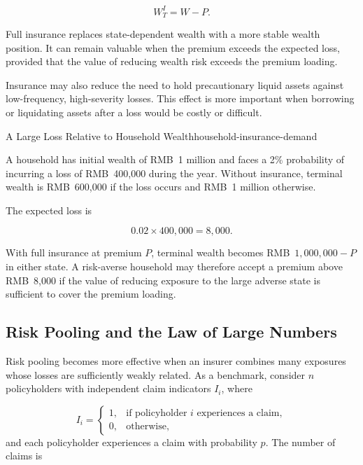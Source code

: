 \begin{equation}
W_T^{I}=W-P.
\label{eq:ch15-fully-insured-wealth}
\end{equation}

Full insurance replaces state-dependent wealth with a more stable wealth position. It can remain valuable when the premium exceeds the expected loss, provided that the value of reducing wealth risk exceeds the premium loading.

Insurance may also reduce the need to hold precautionary liquid assets against low-frequency, high-severity losses. This effect is more important when borrowing or liquidating assets after a loss would be costly or difficult.

\begin{example}{A Large Loss Relative to Household Wealth}{household-insurance-demand}

A household has initial wealth of RMB~1 million and faces
a 2\% probability of incurring a loss of RMB~400,000 during
the year. Without insurance, terminal wealth is RMB~600,000
if the loss occurs and RMB~1 million otherwise.

The expected loss is

$$
0.02\times 400{,}000=8{,}000.
$$

With full insurance at premium $P$, terminal wealth becomes RMB~$1{,}000{,}000-P$ in either state. A risk-averse household may therefore accept a premium above RMB~8,000 if the value of reducing exposure to the large adverse state is sufficient to cover the premium loading.

\end{example}


\subsection{Risk Pooling and the Law of Large Numbers}

Risk pooling becomes more effective when an insurer combines many exposures whose losses are sufficiently weakly related. As a benchmark, consider $n$ policyholders with independent claim indicators $I_i$, where

$$
I_i=
\begin{cases}
1, & \text{if policyholder } i \text{ experiences a claim},\\
0, & \text{otherwise},
\end{cases}
$$
and each policyholder experiences a claim with probability $p$. The number of claims is

